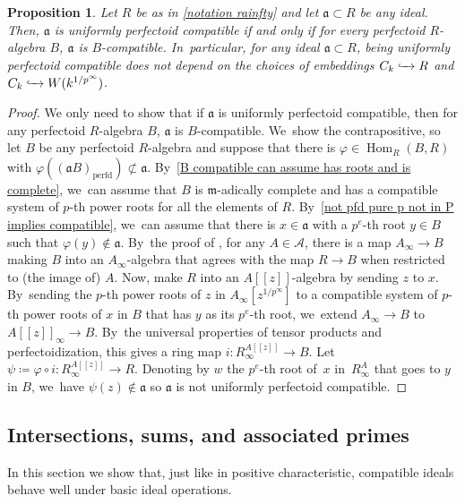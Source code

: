 \documentclass[JEP,XML,SOM,Unicode,published]{cedram}
\let\autoref\cref
\theoremstyle{plain}
\newtheorem{proposition}[theorem]{Proposition}
\theoremstyle{definition}
\numberwithin{equation}{theorem}
\newcommand{\fra}{\mathfrak{a}}
\newcommand{\fram}{\mathfrak{m}}
\DeclareMathOperator{\Hom}{Hom}
\newcommand{\perfd}{_{\mathrm{perfd}}}
\newcommand{\llbracket}{[\![}
\newcommand{\rrbracket}{]\!]}
\newcommand{\into}[1][]{\lhook \joinrel \xrightarrow{\ #1\ }}
\newcommand{\nsubset}{\not\subset}
\newcommand{\sA}{\mathcal{A}}
\newcommand{\pe}{{p^e}}
\renewcommand{\phi}{\varphi}
\newcommand{\unpfty}{{1/p^\infty}}
\newcommand{\rafty}{R^A_\infty}
\begin{document}
\begin{proposition}\label{uniformly perfd compatible does not depend on choice of embedding}
Let $R$ be as in \autoref{notation rainfty} and let $\fra\subset R$ be any ideal. Then, $\fra$ is uniformly perfectoid compatible if and only if for every perfectoid $R$\nobreakdash-algebra $B$, $\fra$ is $B$-compatible. In~particular, for any ideal $\fra\subset R$, being uniformly perfectoid compatible does not depend on the choices of embeddings $C_k\into R$ and $C_k\into W(k^\unpfty)$.
\end{proposition}

\begin{proof}
We only need to show that if $\fra$ is uniformly perfectoid compatible, then for any perfectoid $R$\nobreakdash-algebra $B$, $\fra$ is $B$-compatible. We~show the contrapositive, so let $B$ be any perfectoid $R$\nobreakdash-algebra and suppose that there is $\phi\in \Hom_R(B,R)$ with $\phi( (\fra B)\perfd)\nsubset \fra$. By~\autoref{B compatible can assume has roots and is complete}, we~can assume that $B$ is $\fram$-adically complete and has a compatible system of $p$-th power roots for all the elements of $R$. By~\autoref{not pfd pure p not in P implies compatible}, we~can assume that there is $x\in \fra$ with a $p^e$-th root $y\in B$ such that $\phi(y)\notin\fra$. By~the proof of \cite[Lem.\,4.23]{BMPSTWWPerfectoidPure}, for any $A\in \sA$, there is a map $A_\infty\to B$ making $B$ into an $A_\infty$-algebra that agrees with the map $R\to B$ when restricted to (the image of) $A$. Now, make $R$ into an $A\llbracket z\rrbracket$-algebra by sending $z$ to $x$. By~sending the $p$-th power roots of $z$ in $A_\infty [ z^{\unpfty} ]$ to a compatible system of $p$-th power roots of $x$ in $B$ that has $y$ as its $p^e$-th root, we~extend $A_\infty\to B$ to $A\llbracket z \rrbracket_\infty \to B$. By~the universal properties of tensor products and perfectoidization, this gives a ring map $i\colon R^{A\llbracket z \rrbracket}_\infty \to B$. Let $\psi\coloneqq \phi\circ i\colon R^{A\llbracket z \rrbracket}_\infty\to R$. Denoting by $w$ the $\pe$-th root of~$x$ in~$\rafty$ that goes to $y$ in $B$, we~have $\psi(z)\notin \fra$ so $\fra$ is not uniformly perfectoid compatible.
\end{proof}

\subsection{Intersections, sums, and associated primes} In this section we show that, just like in positive characteristic, compatible ideals behave well under basic ideal operations.
\end{document}
